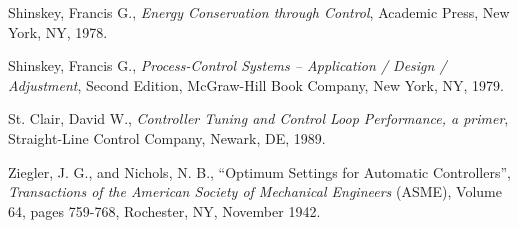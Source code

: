 \vskip 10pt

\noindent
Shinskey, Francis G., \textit{Energy Conservation through Control}, Academic Press, New York, NY, 1978. 

\vskip 10pt

\noindent
Shinskey, Francis G., \textit{Process-Control Systems -- Application / Design / Adjustment}, Second Edition, McGraw-Hill Book Company, New York, NY, 1979. 

\vskip 10pt

\noindent
St. Clair, David W., \textit{Controller Tuning and Control Loop Performance, a primer}, Straight-Line Control Company, Newark, DE, 1989. 

\vskip 10pt

\noindent
Ziegler, J. G., and Nichols, N. B., ``Optimum Settings for Automatic Controllers'', \textit{Transactions of the American Society of Mechanical Engineers} (ASME), Volume 64, pages 759-768, Rochester, NY, November 1942.



















